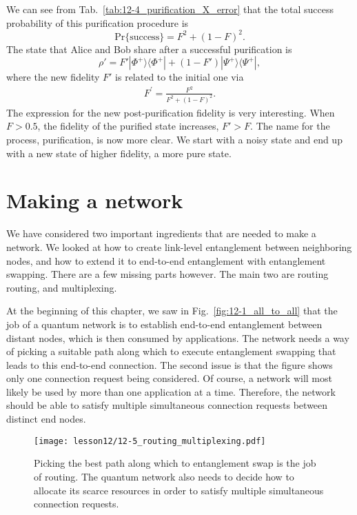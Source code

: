 We can see from Tab.~\ref{tab:12-4_purification_X_error} that the total success probability of this purification procedure is
\begin{equation}
    \text{Pr} \{\text{success}\} = F^2 + (1 - F)^2.
\end{equation}
The state that Alice and Bob share after a successful purification is
\begin{equation}
    \rho' = F' |\Phi^+\rangle\langle\Phi^+| + (1 - F') |\Psi^+\rangle\langle\Psi^+|,
\end{equation}
where the new fidelity $F'$ is related to the initial one via
\begin{align}
    F^{\prime}=\frac{F^{2}}{F^{2}+(1-F)^{2}}.
\end{align}
The expression for the new post-purification fidelity is very interesting.
When $F > 0.5$, the fidelity of the purified state increases, $F' > F$.
The name for the process, purification, is now more clear.
We start with a noisy state and end up with a new state of higher fidelity, a more pure state.



\section{Making a network}
\label{sec:making-a-network}

We have considered two important ingredients that are needed to make a network.
We looked at how to create link-level entanglement between neighboring nodes, and how to extend it to end-to-end entanglement with entanglement swapping.
There are a few missing parts however.
The main two are routing routing, and multiplexing.

At the beginning of this chapter, we saw in Fig.~\ref{fig:12-1_all_to_all} that the job of a quantum network is to establish end-to-end entanglement between distant nodes, which is then consumed by applications.
The network needs a way of picking a suitable path along which to execute entanglement swapping that leads to this end-to-end connection.
The second issue is that the figure shows only one connection request being considered.
Of course, a network will most likely be used by more than one application at a time.
Therefore, the network should be able to satisfy multiple simultaneous connection requests between distinct end nodes.

\begin{figure}[t]
    \centering
    \texttt{[image: lesson12/12-5\_routing\_multiplexing.pdf]}
    \caption[Routing and multiplexing.]{Picking the best path along which to entanglement swap is the job of routing. The quantum network also needs to decide how to allocate its scarce resources in order to satisfy multiple simultaneous connection requests.}
    \label{fig:12-5_routing_multiplexing}
\end{figure}


